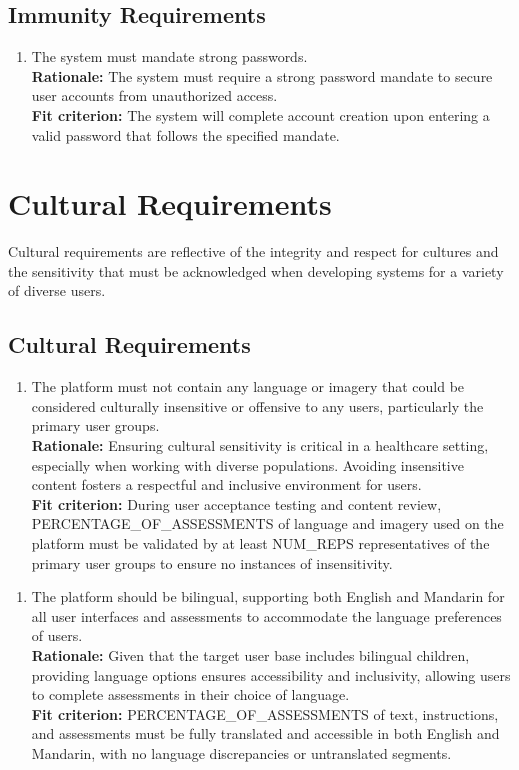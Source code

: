 \documentclass[12pt]{article}
\begin{document}
\subsection{Immunity Requirements}
\begin{enumerate}[label={SR-IM}1. ]
  \item The system must mandate strong passwords.\\
  \textbf{Rationale: }The system must require a strong password mandate to secure user accounts from unauthorized access.\\
  \textbf{Fit criterion: }The system will complete account creation upon entering a valid password that follows the specified mandate. 
\end{enumerate}

\newpage

\section{Cultural Requirements}
\hspace{2em}Cultural requirements are reflective of the integrity and respect for cultures and the sensitivity that must be acknowledged when developing systems for a variety of diverse users.
\subsection{Cultural Requirements}
\begin{enumerate}[label={CU-CR}1. ]
  \item The platform must not contain any language or imagery that could be considered culturally insensitive or offensive to any users, particularly the primary user groups.\\
  \textbf{Rationale: }Ensuring cultural sensitivity is critical in a healthcare setting, especially when working with diverse populations. Avoiding insensitive content fosters a respectful and inclusive environment 
  for users.\\
  \textbf{Fit criterion: }During user acceptance testing and content review, PERCENTAGE\_OF\_ASSESSMENTS of language and imagery used on the platform must be validated by at least NUM\_REPS representatives of the primary user groups to ensure no instances of 
  insensitivity.
\end{enumerate}
\begin{enumerate}[label={CU-CR}2. ]
  \item The platform should be bilingual, supporting both English and Mandarin for all user interfaces and assessments to accommodate the language preferences of users.\\
  \textbf{Rationale: }Given that the target user base includes bilingual children, providing language options ensures accessibility and inclusivity, allowing users to complete assessments in their choice of language.\\
  \textbf{Fit criterion: }PERCENTAGE\_OF\_ASSESSMENTS of text, instructions, and assessments must be fully translated and accessible in both English and Mandarin, with no language discrepancies or untranslated segments.  
\end{enumerate}
\end{document}
